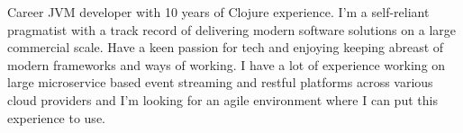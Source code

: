 \vspace{1.0mm}

\paragraphstyle
{Career JVM developer with 10 years of Clojure experience. I'm a self-reliant pragmatist with a track
record of delivering modern software solutions on a large commercial scale. Have a keen passion for tech and enjoying keeping
abreast of modern frameworks and ways of working. I have a lot of experience working on large microservice based
event streaming and restful platforms across various cloud providers and I'm looking for an agile environment where I can put this
experience to use.

}